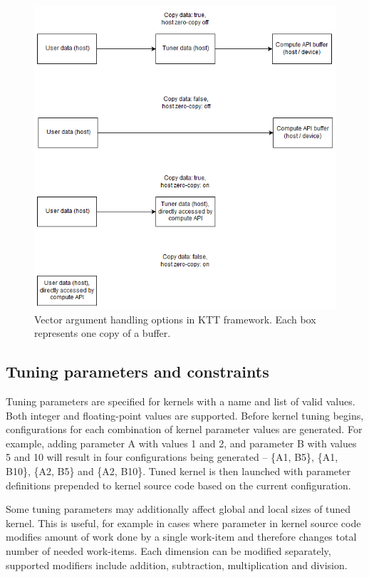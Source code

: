 \documentclass
[
    digital, %
    oneside, %
    table, %
    nolof, %
    nolot, %
    nocover %
]{fithesis3}
\begin{document}
\begin{figure}
\begin{center}
\includegraphics[width=125mm]{resources/ktt_buffer_diagram.png}
\end{center}
\caption{Vector argument handling options in KTT framework. Each box represents one copy of a buffer.}
\label{ktt-buffer-diagram}
\end{figure}

\subsection{Tuning parameters and constraints}
\label{ktt-tuning-parameters}
Tuning parameters are specified for kernels with a name and list of valid values. Both integer and floating-point values are supported. Before kernel
tuning begins, configurations for each combination of kernel parameter values are generated. For example, adding parameter A with values 1 and 2, and
parameter B with values 5 and 10 will result in four configurations being generated -- \{A1, B5\}, \{A1, B10\}, \{A2, B5\} and \{A2, B10\}. Tuned kernel is
then launched with parameter definitions prepended to kernel source code based on the current configuration.

Some tuning parameters may additionally affect global and local sizes of tuned kernel. This is useful, for example in cases where parameter in kernel
source code modifies amount of work done by a single work-item and therefore changes total number of needed work-items. Each dimension can be modified
separately, supported modifiers include addition, subtraction, multiplication and division.
\end{document}
